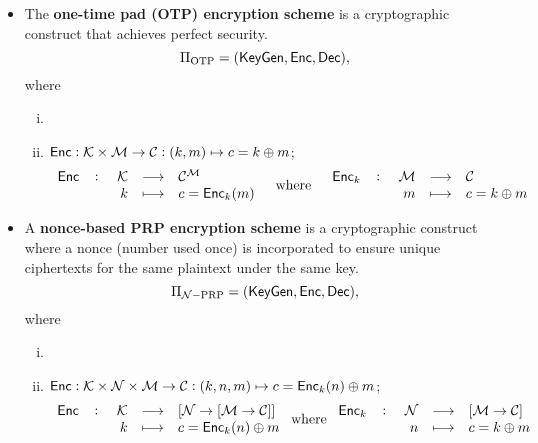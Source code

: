\begin{itemize}
	\item The \textbf{one-time pad (OTP) encryption scheme} is a cryptographic construct that achieves perfect security. \[
	\Pi_{\text{OTP}}=(\mathsf{KeyGen},\mathsf{Enc},\mathsf{Dec}),
	\] where \begin{enumerate}[(i)]
		\item %
		\item $\mathsf{Enc}:\mathcal{K}\times\mathcal{M}\to\mathcal{C}:(k,m)\mapsto c=k\oplus m$;\begin{align*}
			\fullfunction{\enc}{\keyspace}{\ciphertext^{\messagespace}}{k}{c=\enc_{k}(m)}\quad \text{where}\quad \fullfunction{\enc_k}{\messagespace}{\ciphertext}{m}{c=k\oplus m}
		\end{align*}
	\end{enumerate}
	\item A \textbf{nonce-based PRP encryption scheme} is a cryptographic construct where a nonce (number used once) is incorporated to ensure unique ciphertexts for the same plaintext under the same key. 
	\[
	\Pi_{\mathcal{N}-\text{PRP}}=(\mathsf{KeyGen},\mathsf{Enc},\mathsf{Dec}),
	\] where \begin{enumerate}[(i)]
		\item %
		\item $\mathsf{Enc}:\mathcal{K}\times\mathcal{N}\times\mathcal{M}\to\mathcal{C}:(k,n,m)\mapsto c=\mathsf{Enc}_{k}(n)\oplus m$; \begin{align*}
		\fullfunction{\enc}{\keyspace}{[\nonce\to[\messagespace\to\ciphertext]]}{k}{c=\enc_k(n)\oplus m}\ \text{where}\ \fullfunction{\enc_k}{\nonce}{[\messagespace\to\ciphertext]}{n}{c=k\oplus m}
		\end{align*}
	\end{enumerate}
\end{itemize}

\newpage
